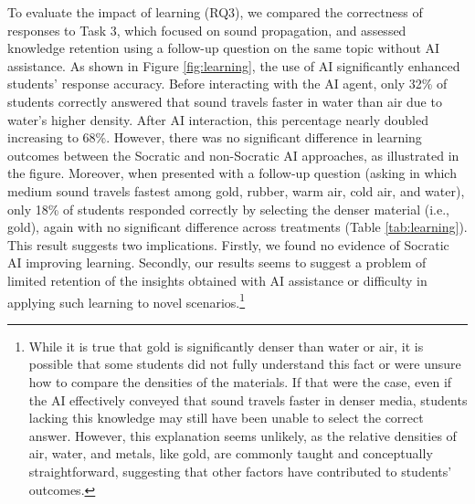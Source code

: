 \documentclass[
  11pt,
]{article}
\begin{document}
To evaluate the impact of learning (RQ3), we compared the correctness of responses to Task 3, which focused on sound propagation, and assessed knowledge retention using a follow-up question on the same topic without AI assistance. As shown in Figure \ref{fig:learning}, the use of AI significantly enhanced students' response accuracy. Before interacting with the AI agent, only 32\% of students correctly answered that sound travels faster in water than air due to water's higher density. After AI interaction, this percentage nearly doubled increasing to 68\%. However, there was no significant difference in learning outcomes between the Socratic and non-Socratic AI approaches, as illustrated in the figure. Moreover, when presented with a follow-up question (asking in which medium sound travels fastest among gold, rubber, warm air, cold air, and water), only 18\% of students responded correctly by selecting the denser material (i.e., gold), again with no significant difference across treatments (Table \ref{tab:learning}). This result suggests two implications. Firstly, we found no evidence of Socratic AI improving learning. Secondly, our results seems to suggest a problem of limited retention of the insights obtained with AI assistance or difficulty in applying such learning to novel scenarios.\footnote{While it is true that gold is significantly denser than water or air, it is possible that some students did not fully understand this fact or were unsure how to compare the densities of the materials. If that were the case, even if the AI effectively conveyed that sound travels faster in denser media, students lacking this knowledge may still have been unable to select the correct answer. However, this explanation seems unlikely, as the relative densities of air, water, and metals, like gold, are commonly taught and conceptually straightforward, suggesting that other factors have contributed to students' outcomes.}
\end{document}
